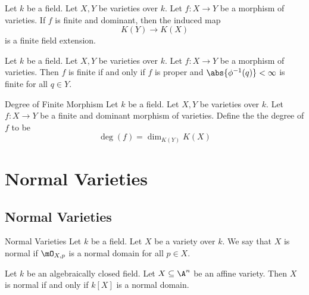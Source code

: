 \documentclass[a4paper]{article}
\begin{document}
\begin{prp}{}{} Let $k$ be a field. Let $X,Y$ be varieties over $k$. Let $f:X\to Y$ be a morphism of varieties. If $f$ is finite and dominant, then the induced map $$K(Y)\to K(X)$$ is a finite field extension. 
\end{prp}

\begin{prp}{}{} Let $k$ be a field. Let $X,Y$ be varieties over $k$. Let $f:X\to Y$ be a morphism of varieties. Then $f$ is finite if and only if $f$ is proper and $\abs{\phi^{-1}(q)}<\infty$ is finite for all $q\in Y$. 
\end{prp}

\begin{defn}{Degree of Finite Morphism}{} Let $k$ be a field. Let $X,Y$ be varieties over $k$. Let $f:X\to Y$ be a finite and dominant morphism of varieties. Define the the degree of $f$ to be $$\deg(f)=\dim_{K(Y)}K(X)$$
\end{defn}

\pagebreak
\section{Normal Varieties}
\subsection{Normal Varieties}
\begin{defn}{Normal Varieties}{} Let $k$ be a field. Let $X$ be a variety over $k$. We say that $X$ is normal if $\mO_{X,p}$ is a normal domain for all $p\in X$. 
\end{defn}

\begin{prp}{}{} Let $k$ be an algebraically closed field. Let $X\subseteq\A^n$ be an affine variety. Then $X$ is normal if and only if $k[X]$ is a normal domain. 
\end{prp}
\end{document}
